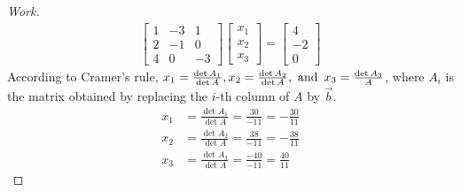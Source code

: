 \documentclass{article}
\begin{document}
\begin{proof}[Work]
  \begin{align*}
    \begin{bmatrix}
      1 & -3 & 1  \\
      2 & -1 & 0  \\
      4 & 0  & -3
    \end{bmatrix}
    \begin{bmatrix}
      x_1 \\ x_2 \\ x_3
    \end{bmatrix} =
    \begin{bmatrix}
      4 \\ -2 \\ 0
    \end{bmatrix}
  \end{align*}
  According to Cramer's rule, $x_1 = \frac{\det A_1}{\det A}, x_2 = \frac{\det A_2}{\det A}, \operatorname{~\text{and}~} x_3 = \frac{\det A_3}{A}$, where $A_i$ is the matrix obtained by replacing the $i$-th column of $A$ by $\vec{b}$.
  \begin{align*}
    x_1 & = \frac{\det A_1}{\det A} = \frac{30}{-11} = -\frac{30}{11} \\
    x_2 & = \frac{\det A_2}{\det A} = \frac{38}{-11} = -\frac{38}{11} \\
    x_3 & = \frac{\det A_3}{\det A} = \frac{-40}{-11} = \frac{40}{11}
  \end{align*}
\end{proof}
\qdash
\end{document}

